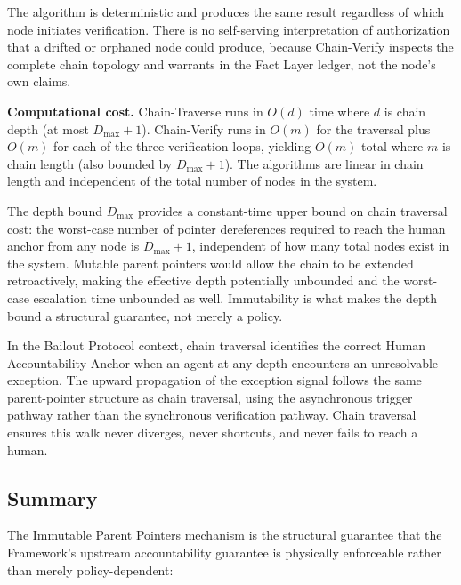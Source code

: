 The algorithm is deterministic and produces the same result regardless of which node initiates verification. There is no self-serving interpretation of authorization that a drifted or orphaned node could produce, because Chain-Verify inspects the complete chain topology and warrants in the Fact Layer ledger, not the node's own claims.

\bigskip
\noindent\textbf{Computational cost.} Chain-Traverse runs in $O(d)$ time where $d$ is chain depth (at most $D_{\max} + 1$). Chain-Verify runs in $O(m)$ for the traversal plus $O(m)$ for each of the three verification loops, yielding $O(m)$ total where $m$ is chain length (also bounded by $D_{\max} + 1$). The algorithms are linear in chain length and independent of the total number of nodes in the system.

The depth bound $D_{\max}$ provides a constant-time upper bound on chain traversal cost: the worst-case number of pointer dereferences required to reach the human anchor from any node is $D_{\max} + 1$, independent of how many total nodes exist in the system. Mutable parent pointers would allow the chain to be extended retroactively, making the effective depth potentially unbounded and the worst-case escalation time unbounded as well. Immutability is what makes the depth bound a structural guarantee, not merely a policy.

In the Bailout Protocol context, chain traversal identifies the correct Human Accountability Anchor when an agent at any depth encounters an unresolvable exception. The upward propagation of the exception signal follows the same parent-pointer structure as chain traversal, using the asynchronous trigger pathway rather than the synchronous verification pathway. Chain traversal ensures this walk never diverges, never shortcuts, and never fails to reach a human.

\subsection{Summary}
\label{sec:ipp-summary}

The Immutable Parent Pointers mechanism is the structural guarantee that the \bxthree{} Framework's upstream accountability guarantee is physically enforceable rather than merely policy-dependent:

